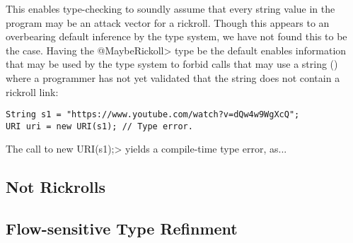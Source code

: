 \noindent This enables type-checking to soundly assume that every string value
in the program may be an attack vector for a rickroll.
Though this appears to an overbearing default inference by the type system,
we have not found this to be the case.
Having the \<@MaybeRickoll> type be the default enables information that may
be used by the type system to forbid calls that may use a string
() where a programmer has not yet validated that the string
does not contain a rickroll link:

\prelistingspace
\begin{lstlisting}[frame=tb]
String s1 = "https://www.youtube.com/watch?v=dQw4w9WgXcQ";
URI uri = new URI(s1); // Type error.
\end{lstlisting}
\postlistingspace

\noindent The call to \<new URI(s1);> yields a compile-time type error, as...

\subsection{Not Rickrolls}
\label{subsec:not-rickrolls}

\subsection{Flow-sensitive Type Refinment}
\label{subsec:flow-sensitive-type-refinement}
